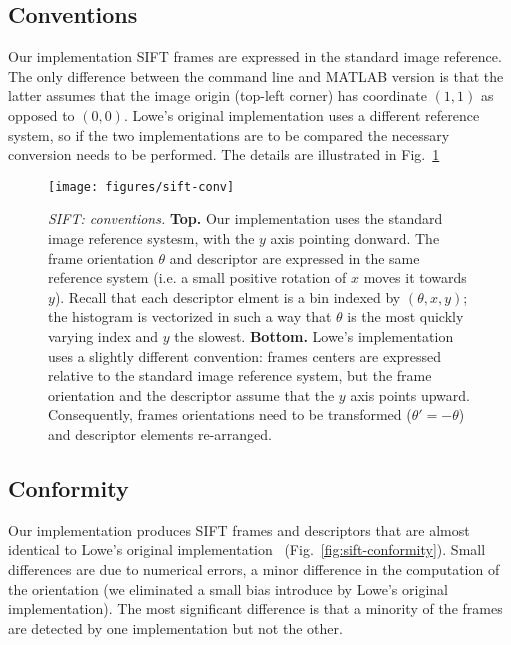 \documentclass[9.5pt]{article}
\begin{document}
\subsection{Conventions}\label{sift.conventions}

Our implementation SIFT frames are expressed in the standard image
reference.  The only difference between the command line and MATLAB
version is that the latter assumes that the image origin (top-left
corner) has coordinate $(1,1)$ as opposed to $(0,0)$. Lowe's original
implementation uses a different reference system, so if the two implementations
are to be compared the necessary conversion needs to be performed.
The details are illustrated in Fig.~\ref{fig:sift-conv}

\begin{figure}
\begin{center}
\texttt{[image: figures/sift-conv]}
\end{center}
\caption{{\em SIFT: conventions.} {\bf Top.} Our implementation uses
  the standard image reference systesm, with the $y$ axis pointing
  donward. The frame orientation $\theta$ and descriptor are expressed
  in the same reference system (i.e. a small positive rotation of $x$
  moves it towards $y$). Recall that each descriptor elment is a bin
  indexed by $(\theta,x,y)$; the histogram is vectorized in such a way
  that $\theta$ is the most quickly varying index and $y$ the
  slowest. {\bf Bottom.} Lowe's implementation uses a slightly
  different convention: frames centers are expressed relative to the
  standard image reference system, but the frame orientation and the
  descriptor assume that the $y$ axis points upward. Consequently,
  frames orientations need to be transformed ($\theta'=-\theta$) and
  descriptor elements re-arranged.}
\label{fig:sift-conv}
\end{figure}

\subsection{Conformity}\label{sift.conformity}

Our implementation produces SIFT frames and descriptors that are
almost identical to Lowe's original implementation~\cite{lowe07sift}
(Fig.~\ref{fig:sift-conformity}). Small differences are due to
numerical errors, a minor difference in the computation of the
orientation (we eliminated a small bias introduce by Lowe's original implementation). 
The most significant difference is that a minority of the frames are detected by one implementation but not the other.
\end{document}
